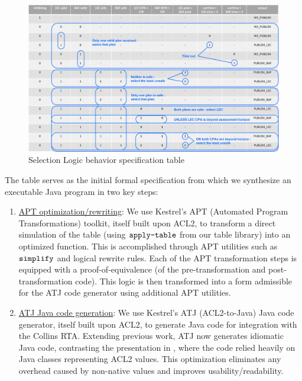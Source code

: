 \begin{figure}
	\centering
	\includegraphics[width=\textwidth]{figures/selection-logic.jpg}
	\caption{Selection Logic behavior specification table}
	\label{fig:selection-logic}
\end{figure}


The table serves as the initial formal specification from which we synthesize an executable Java program in two key steps:
\begin{enumerate}
\item \underline{APT optimization/rewriting}: We use Kestrel's APT (Automated Program Transformations) \cite{apt} toolkit, itself built upon ACL2, to transform a direct simulation of the table (using $\verb+apply-table+$ from our table library) into an optimized function. This is accomplished through APT utilities such as $\verb+simplify+$ and logical rewrite rules. Each of the APT transformation steps is equipped with a proof-of-equivalence (of the pre-transformation and post-transformation code). This logic is then transformed into a form admissible for the ATJ code generator using additional APT utilities.
\item \underline{ATJ Java code generation}: We use Kestrel's ATJ (ACL2-to-Java) Java code generator, itself built upon ACL2, to generate Java code for integration with the Collins RTA. Extending previous work, ATJ now generates idiomatic Java code, contrasting the presentation in \cite{dasc2020}, where the code relied heavily on Java classes representing ACL2 values. This optimization eliminates any overhead caused by non-native values and improves usability/readability.
\end{enumerate}


